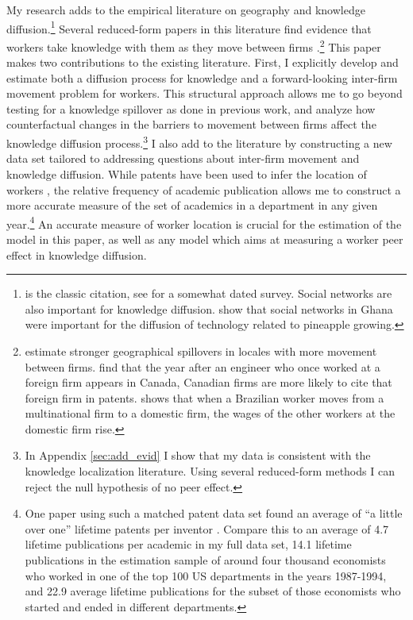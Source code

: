 \documentclass[]{article}
\begin{document}
My research adds to the empirical literature on geography and knowledge diffusion.\footnote{\citep{jaffe1993geographic} is the classic citation, see \citep{breschi2001knowledge} for a somewhat dated survey.  Social networks are also important for knowledge diffusion. \citet{conley2010learning} show that social networks in Ghana were important for the diffusion of technology related to pineapple growing.} Several reduced-form papers in this literature find evidence that workers take knowledge with them as they move between firms \citep{almeida1999localization, oettl2008international, poole2013knowledge}.\footnote{\citep{almeida1999localization} estimate stronger geographical spillovers in locales with more movement between firms. \citet{oettl2008international} find that the year after an engineer who once worked at a foreign firm appears in Canada, Canadian firms are more likely to cite that foreign firm in patents. \citet{poole2013knowledge} shows that when a Brazilian worker moves from a multinational firm to a domestic firm, the wages of the other workers at the domestic firm rise.}   This paper makes two contributions to the existing literature. First, I explicitly develop and estimate both a diffusion process for knowledge and a forward-looking inter-firm movement problem for workers.  This structural approach allows me to go beyond testing for a knowledge spillover as done in previous work, and analyze how counterfactual changes in the barriers to movement between firms affect the knowledge diffusion process.\footnote{In Appendix \ref{sec:add_evid} I show that my data is consistent with the knowledge localization literature. Using several reduced-form methods I can reject the null hypothesis of no peer effect.}   I also add to the literature by constructing a new data set tailored to addressing questions about inter-firm movement and knowledge diffusion.  While patents have been used to infer the location of workers \citep{oettl2008international}, the relative frequency of academic publication allows me to construct a more accurate measure of the set of academics in a department in any given year.\footnote{One paper using such a matched patent data set found an average of ``a little over one'' lifetime patents per inventor \citep{kim2009international}. Compare this to an average of 4.7 lifetime publications per academic in my full data set, 14.1 lifetime publications in the estimation sample of around four thousand economists who worked in one of the top 100 US departments in the years 1987-1994, and 22.9 average lifetime publications for the subset of those economists who started and ended in different departments.} An accurate measure of worker location is crucial for the estimation of the model in this paper, as well as any model which aims at measuring a worker peer effect in knowledge diffusion. %
\end{document}
